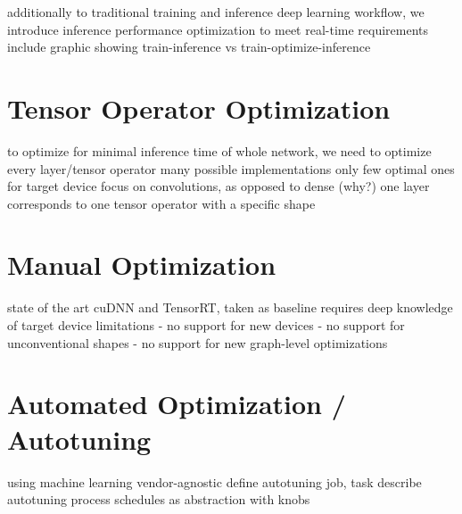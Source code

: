 additionally to traditional training and inference deep learning workflow, we introduce inference performance optimization to meet real-time requirements
include graphic showing train-inference vs train-optimize-inference

\section{Tensor Operator Optimization}
to optimize for minimal inference time of whole network, we need to optimize every layer/tensor operator
many possible implementations
only few optimal ones for target device
focus on convolutions, as opposed to dense (why?)
one layer corresponds to one tensor operator with a specific shape

\section{Manual Optimization}
state of the art cuDNN and TensorRT, taken as baseline
requires deep knowledge of target device
limitations
- no support for new devices
- no support for unconventional shapes
- no support for new graph-level optimizations

\section{Automated Optimization / Autotuning}
using machine learning
vendor-agnostic
define autotuning job, task
describe autotuning process
schedules as abstraction with knobs
